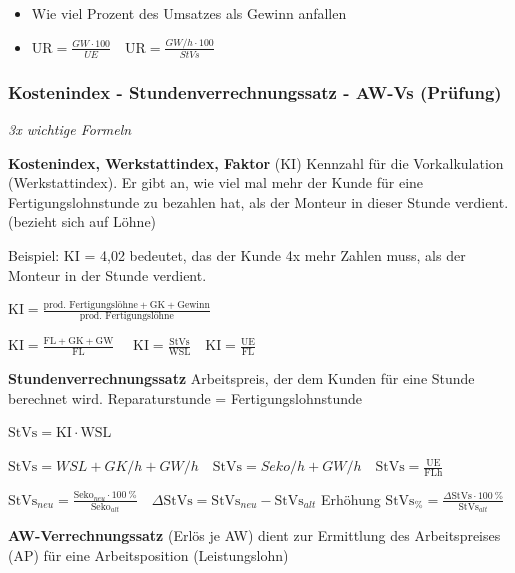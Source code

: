\begin{enumerate}
  \begin{itemize}
  \item
    Wie viel Prozent des Umsatzes als Gewinn anfallen
  \item
    $\boxed{\text{UR} = \frac{GW \cdot 100}{UE}} \quad \boxed{\text{UR} = \frac{GW/h \cdot 100}{StVs}}$
  \end{itemize}
\end{enumerate}

\newpage

\subsubsection{Kostenindex - Stundenverrechnungssatz - AW-Vs
(Prüfung)}\label{kostenindex-stundenverrechnungssatz-aw-vs-pruefung}

\emph{3x wichtige Formeln}

\textbf{Kostenindex, Werkstattindex, Faktor} (KI) Kennzahl für die
Vorkalkulation (Werkstattindex). Er gibt an, wie viel mal mehr der Kunde
für eine Fertigungslohnstunde zu bezahlen hat, als der Monteur in dieser
Stunde verdient. (bezieht sich auf Löhne)

Beispiel: KI = 4,02 bedeutet, das der Kunde 4x mehr Zahlen muss, als der
Monteur in der Stunde verdient.

$\boxed{\text{KI} = \frac{\text{prod. Fertigungslöhne} + \text{GK} + \text{Gewinn}}{\text{prod. Fertigungslöhne}}}$

$\boxed{\text{KI} = \frac{\text{FL} + \text{GK} + \text{GW}}{\text{FL}}} \quad$
$\boxed{\text{KI} = \frac{\text{StVs}}{\text{WSL}}} \quad \boxed{\text{KI} = \frac{\text{UE}}{\text{FL}}}$

\textbf{Stundenverrechnungssatz} Arbeitspreis, der dem Kunden für eine
Stunde berechnet wird. Reparaturstunde = Fertigungslohnstunde

$\boxed{\text{StVs} = \text{KI} \cdot \text{WSL}}$

$\boxed{\text{StVs} = WSL + GK/h + GW/h} \quad \boxed{\text{StVs} = Seko/h + GW/h} \quad \boxed{\text{StVs} = \frac{\text{UE}}{\text{FLh}}}$

$\boxed{\text{StVs}_{neu} = \frac{\text{Seko}_{neu} \cdot 100~\%}{\text{Seko}_{alt}}} \quad \boxed{\Delta \text{StVs} = \text{StVs}_{neu} - \text{StVs}_{alt}}$
Erhöhung
$\boxed{\text{StVs}_\% = \frac{\Delta \text{StVs} \cdot 100~\%}{\text{StVs}_{alt}}}$

\textbf{AW-Verrechnungssatz} (Erlös je AW) dient zur Ermittlung des
Arbeitspreises (AP) für eine Arbeitsposition (Leistungslohn)


